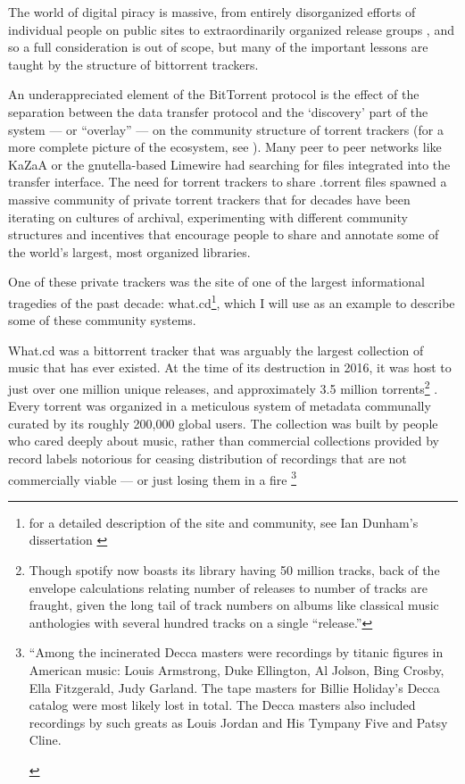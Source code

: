 \documentclass[11pt]{article}
\begin{document}
\begin{multicols}{2}
The world of digital piracy is massive, from entirely disorganized
efforts of individual people on public sites to extraordinarily
organized release groups \cite{basamanowiczReleaseGroupsDigital2011} , and so a full consideration is out of scope, but many of the
important lessons are taught by the structure of bittorrent trackers.

An underappreciated element of the BitTorrent protocol is the effect of
the separation between the data transfer protocol and the `discovery'
part of the system --- or ``overlay'' --- on the community structure of
torrent trackers (for a more complete picture of the ecosystem, see \cite{zhangUnravelingBitTorrentEcosystem2011} ). Many peer to peer
networks like KaZaA or the gnutella-based Limewire had searching for
files integrated into the transfer interface. The need for torrent
trackers to share .torrent files spawned a massive community of private
torrent trackers that for decades have been iterating on cultures of
archival, experimenting with different community structures and
incentives that encourage people to share and annotate some of the
world's largest, most organized libraries.

One of these private trackers was the site of one of the largest
informational tragedies of the past decade: what.cd\footnote{for a
  detailed description of the site and community, see Ian Dunham's
  dissertation \cite{dunhamWhatCDLegacy2018} }, which I will use
as an example to describe some of these community systems.

What.cd was a bittorrent tracker that was arguably the largest
collection of music that has ever existed. At the time of its
destruction in 2016, it was host to just over one million unique
releases, and approximately 3.5 million torrents\footnote{Though spotify
  now boasts its library having 50 million tracks, back of the envelope
  calculations relating number of releases to number of tracks are
  fraught, given the long tail of track numbers on albums like classical
  music anthologies with several hundred tracks on a single ``release.''}
\cite{dunhamWhatCDLegacy2018} . Every torrent was organized in a
meticulous system of metadata communally curated by its roughly 200,000
global users. The collection was built by people who cared deeply about
music, rather than commercial collections provided by record labels
notorious for ceasing distribution of recordings that are not
commercially viable --- or just losing them in a fire \cite{rosenDayMusicBurned2019} \footnote{\begin{leftbar}
  ``Among the incinerated Decca masters were recordings by titanic
  figures in American music: Louis Armstrong, Duke Ellington, Al Jolson,
  Bing Crosby, Ella Fitzgerald, Judy Garland. The tape masters for
  Billie Holiday's Decca catalog were most likely lost in total. The
  Decca masters also included recordings by such greats as Louis Jordan
  and His Tympany Five and Patsy Cline.


\end{leftbar}}
\end{multicols}
\end{document}
